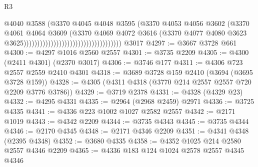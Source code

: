 \begin{lexlean}{R3}
\begin{coremodule}
                                                                  @4040
                                                                  @3588
                                                                  (@3370
                                                                    @4045
                                                                    @4048
                                                                    @3595
                                                                    (@3370
                                                                      @4053
                                                                      @4056
                                                                      @3602
                                                                      (@3370
                                                                        @4061
                                                                        @4064
                                                                        @3609
                                                                        (@3370
                                                                          @4069
                                                                          @4072
                                                                          @3616
                                                                          (@3370
                                                                            @4077
                                                                            @4080
                                                                            @3623
                                                                            @3625))))))))))))))))))))))))))))))))))))
    @3017
@4297 := @3667 @3728 @661
@4300 := @4297 @1016 @2560 @2557
@4301 := @3735 @2209
@4305 := @4300 (@2411 @4301) (@2370 @3017)
@4306 := @3746 @177
@4311 := @4306 @723 @2557 @2559 @2410 @4301
@4318 := @3689 @3728 @159 @2410 (@3694 (@3695 @3728 @159))
@4328 := @4305 (@4311 @4318 (@3770 @214 @2557 @2557 @720 @2209 @3776 @3786))
@4329 := @3719 @2378
@4331 := @4328 (@4329 @23)
@4332 := @4295 @4331
@4335 := @2964 (@2968 @2459) @2971
@4336 := @3725 @4335
@4341 := @4336 @223 @1002 @1027 @2582 @2557
@4342 := @2171 @1019
@4343 := @4342 @2209
@4344 := @3735 @4343
@4345 := @3735 @4344
@4346 := @2170 @4345
@4348 := @2171 @4346 @2209
@4351 := @4341 @4348 (@2395 @4348)
@4352 := @3680 @4335
@4358 := @4352 @1025 @214 @2580 @2557 @4346 @2209
@4365 := @4336 @183 @124 @1024 @2578 @2557 @4345 @4346

\end{coremodule}
\end{lexlean}
